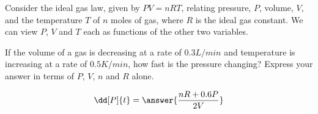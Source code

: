 \documentclass{ximera}
\author{David Guichard \and Neal Koblitz \and H. Jerome Keisler \and Albert Scheller \and Barry Balof \and Mike Wills \and Matthew Carr \and Bart Snapp}
\begin{document}
\begin{exercise}
Consider the ideal gas law, given by $PV=nRT$, relating pressure, $P$, volume, $V$, and the temperature $T$ of $n$ moles of gas, where $R$ is the ideal gas constant. We can view $P$, $V$ and $T$ each as functions of the other two variables. 

If the volume of a gas is decreasing at a rate of $0.3\unit{L/min}$ and temperature is increasing at a rate of $0.5\unit{K/min}$, how fast is the pressure changing? Express your answer in terms of $P$, $V$, $n$ and $R$ alone.

\begin{prompt}
\[
\dd[P]{t}=\answer{\frac{n R+0.6 P}{2V}}
\]
\end{prompt}

\end{exercise}
\end{document}
